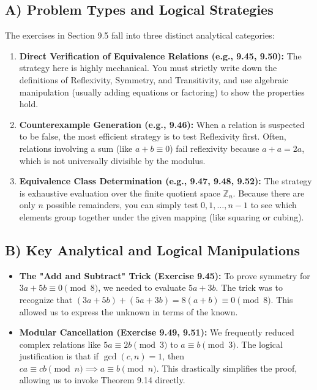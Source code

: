 \documentclass[11pt, a4paper]{article}
\theoremstyle{definition}
\theoremstyle{remark}
\begin{document}
\subsection{A) Problem Types and Logical Strategies}
The exercises in Section 9.5 fall into three distinct analytical categories:
\begin{enumerate}
    \item \textbf{Direct Verification of Equivalence Relations (e.g., 9.45, 9.50):} The strategy here is highly mechanical. You must strictly write down the definitions of Reflexivity, Symmetry, and Transitivity, and use algebraic manipulation (usually adding equations or factoring) to show the properties hold.
    \item \textbf{Counterexample Generation (e.g., 9.46):} When a relation is suspected to be false, the most efficient strategy is to test Reflexivity first. Often, relations involving a sum (like $a + b \equiv 0$) fail reflexivity because $a + a = 2a$, which is not universally divisible by the modulus.
    \item \textbf{Equivalence Class Determination (e.g., 9.47, 9.48, 9.52):} The strategy is exhaustive evaluation over the finite quotient space $\mathbb{Z}_n$. Because there are only $n$ possible remainders, you can simply test $0, 1, \dots, n-1$ to see which elements group together under the given mapping (like squaring or cubing).
\end{enumerate}

\subsection{B) Key Analytical and Logical Manipulations}
\begin{itemize}
    \item \textbf{The "Add and Subtract" Trick (Exercise 9.45):} To prove symmetry for $3a + 5b \equiv 0 \pmod{8}$, we needed to evaluate $5a + 3b$. The trick was to recognize that $(3a + 5b) + (5a + 3b) = 8(a + b) \equiv 0 \pmod{8}$. This allowed us to express the unknown in terms of the known.
    \item \textbf{Modular Cancellation (Exercise 9.49, 9.51):} We frequently reduced complex relations like $5a \equiv 2b \pmod{3}$ to $a \equiv b \pmod{3}$. The logical justification is that if $\gcd(c, n) = 1$, then $ca \equiv cb \pmod{n} \implies a \equiv b \pmod{n}$. This drastically simplifies the proof, allowing us to invoke Theorem 9.14 directly.
\end{itemize}
\end{document}
